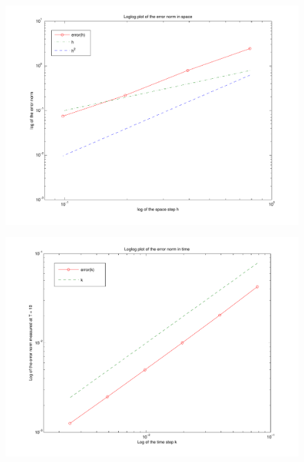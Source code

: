 \documentclass[screen]{beamer}
\begin{document}
\begin{frame}

\begin{figure}[htb]
\includegraphics[width=1\textwidth]{conv_space_IMEX_T50.pdf}
\end{figure}

\end{frame}

\begin{frame}

\begin{figure}[htb]
\includegraphics[width=1\textwidth]{conv_time_IMEX2.pdf}
\end{figure}

\end{frame}
\end{document}
